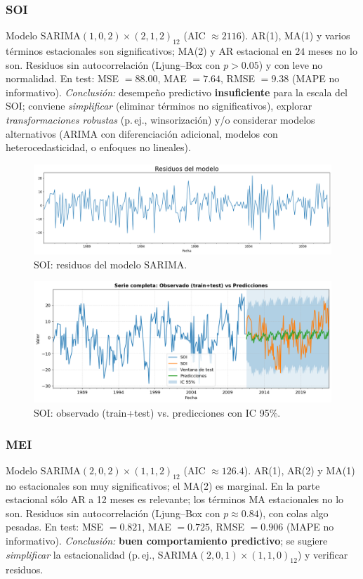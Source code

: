 \subsubsection{SOI}
Modelo SARIMA$(1,0,2)\times(2,1,2)_{12}$ (AIC $\approx 2116$).
AR(1), MA(1) y varios términos estacionales son significativos; MA(2) y AR estacional en
$24$ meses no lo son. Residuos sin autocorrelación (Ljung--Box con $p>0.05$) y con leve
no normalidad. En test: MSE $=88.00$, MAE $=7.64$, RMSE $=9.38$ (MAPE no informativo).
\emph{Conclusión:} desempeño predictivo \textbf{insuficiente} para la escala del SOI; conviene
\emph{simplificar} (eliminar términos no significativos), explorar \emph{transformaciones
robustas} (p.\,ej., winsorización) y/o considerar modelos alternativos (ARIMA con
diferenciación adicional, modelos con heterocedasticidad, o enfoques no lineales).
\vspace{0.3em}

\begin{figure}[H]\centering
\includegraphics[scale=.30]{Figures/res_sarima_soi.png}
\caption{SOI: residuos del modelo SARIMA.}
\label{fig:res_soi}
\end{figure}


\begin{figure}[H]\centering
\includegraphics[scale=.42]{Figures/pred_soi.png}
\caption{SOI: observado (train+test) vs. predicciones con IC 95\%.}
\label{fig:pred_soi}
\end{figure}


\subsubsection{MEI}
Modelo SARIMA$(2,0,2)\times(1,1,2)_{12}$ (AIC $\approx 126.4$).
AR(1), AR(2) y MA(1) no estacionales son muy significativos; el MA(2) es marginal. 
En la parte estacional sólo AR a 12 meses es relevante; los términos MA estacionales no lo son.
Residuos sin autocorrelación (Ljung--Box con $p\approx 0.84$), con colas algo pesadas.
En test: MSE $=0.821$, MAE $=0.725$, RMSE $=0.906$ (MAPE no informativo).
\emph{Conclusión:} \textbf{buen comportamiento predictivo}; se sugiere \emph{simplificar}
la estacionalidad (p.\,ej., SARIMA$(2,0,1)\times(1,1,0)_{12}$) y verificar residuos.
\vspace{0.3em}

